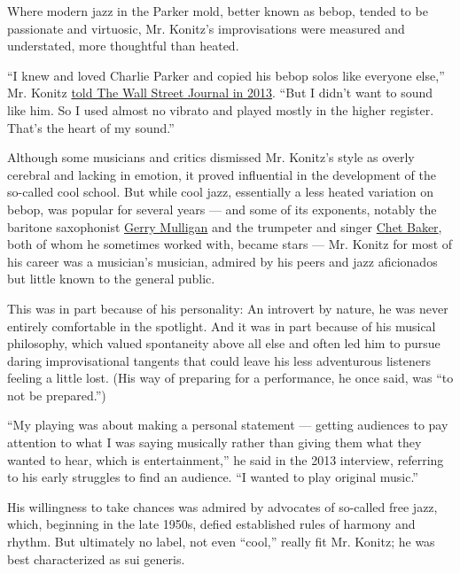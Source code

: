 Where modern jazz in the Parker mold, better known as bebop, tended to
be passionate and virtuosic, Mr. Konitz's improvisations were measured
and understated, more thoughtful than heated.

``I knew and loved Charlie Parker and copied his bebop solos like
everyone else,'' Mr. Konitz
\href{https://www.wsj.com/articles/jazzs-king-of-coola-cool-65-1378152141}{told
The Wall Street Journal in 2013}. ``But I didn't want to sound like him.
So I used almost no vibrato and played mostly in the higher register.
That's the heart of my sound.''

Although some musicians and critics dismissed Mr. Konitz's style as
overly cerebral and lacking in emotion, it proved influential in the
development of the so-called cool school. But while cool jazz,
essentially a less heated variation on bebop, was popular for several
years --- and some of its exponents, notably the baritone saxophonist
\href{https://www.nytimes.com/1996/01/21/nyregion/gerry-mulligan-a-baritone-saxophonist-and-cool-school-jazz-pioneerdies-at-68.html}{Gerry
Mulligan} and the trumpeter and singer
\href{https://www.nytimes.com/1988/05/14/obituaries/chet-baker-jazz-trumpeter-dies-at-59-in-a-fall.html}{Chet
Baker}, both of whom he sometimes worked with, became stars --- Mr.
Konitz for most of his career was a musician's musician, admired by his
peers and jazz aficionados but little known to the general public.

This was in part because of his personality: An introvert by nature, he
was never entirely comfortable in the spotlight. And it was in part
because of his musical philosophy, which valued spontaneity above all
else and often led him to pursue daring improvisational tangents that
could leave his less adventurous listeners feeling a little lost. (His
way of preparing for a performance, he once said, was ``to not be
prepared.'')

``My playing was about making a personal statement --- getting audiences
to pay attention to what I was saying musically rather than giving them
what they wanted to hear, which is entertainment,'' he said in the 2013
interview, referring to his early struggles to find an audience. ``I
wanted to play original music.''

His willingness to take chances was admired by advocates of so-called
free jazz, which, beginning in the late 1950s, defied established rules
of harmony and rhythm. But ultimately no label, not even ``cool,''
really fit Mr. Konitz; he was best characterized as sui generis.


